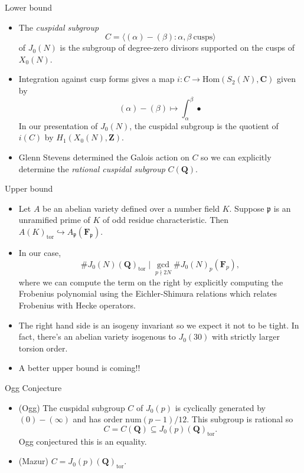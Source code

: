 \documentclass{beamer}
\newcommand{\QQ}{\mathbf{Q}}
\newcommand{\FF}{\mathbf{F}}
\newcommand{\ZZ}{\mathbf{Z}}
\newcommand{\CC}{\mathbf{C}}
\newcommand{\tor}{\mathrm{tor}}
\newcommand{\Hom}{\mathrm{Hom}}
\newcommand{\p}{\mathfrak{p}}
\begin{document}
\begin{frame}{Lower bound}
    \begin{itemize}
        \item    
            The \emph{cuspidal subgroup} 
            \[
                C = \langle (\alpha)-(\beta):\alpha,\beta~\text{cusps}
                \rangle
            \]
            of $J_0(N)$ is the subgroup of
            degree-zero divisors supported on the cusps of $X_0(N)$.
        \item
            Integration against cusp forms
            gives a map $i:C\to \Hom(S_2(N), \CC)$ given by 
            \[
                (\alpha)-(\beta) \mapsto \int_\alpha ^\beta \bullet
            \]
            In our presentation of $J_0(N)$, the cuspidal subgroup is the
            quotient of $i(C)$ by $H_1(X_0(N), \ZZ)$. 
        \item
            Glenn Stevens determined the Galois action on $C$ so we can
            explicitly determine the \emph{rational cuspidal subgroup}
            $C(\QQ)$.
    \end{itemize}
\end{frame}

\begin{frame}{Upper bound}
    \begin{itemize}
        \item 
            Let $A$ be an abelian variety defined over a number field $K$.
            Suppose $\p$ is an unramified prime of $K$ of odd residue
            characteristic. Then $A(K)_\tor \hookrightarrow A_\p(\FF_\p)$.
        \item
            In our case,
            \[
                \#J_0(N)(\QQ)_\tor \mid  \gcd_{p\nmid 2N} \#J_0(N)_p (\FF_p),
            \]
            where we can compute the term on the right by explicitly computing
            the Frobenius polynomial using the Eichler-Shimura relations which
            relates Frobenius with Hecke operators.
        \item
            The right hand side is an isogeny invariant so we expect it not to
            be tight. In fact, there's an abelian variety isogenous to
            $J_0(30)$ with strictly larger torsion order.
        \item
            A better upper bound is coming!!
    \end{itemize} 
\end{frame}

\begin{frame}{Ogg Conjecture}
    \begin{itemize}
        \item 
            (Ogg) The cuspidal subgroup $C$ of $J_0(p)$ is cyclically generated
            by $(0)-(\infty)$ and has order $\mathrm{num} (p-1)/12$. This
            subgroup is rational so 
            \[
                C=C(\QQ)\subseteq J_0(p)(\QQ)_\tor.
            \]
            Ogg conjectured this is an equality.
        \item
            (Mazur) $C=J_0(p)(\QQ)_\tor$.
    \end{itemize}
\end{frame}
\end{document}
